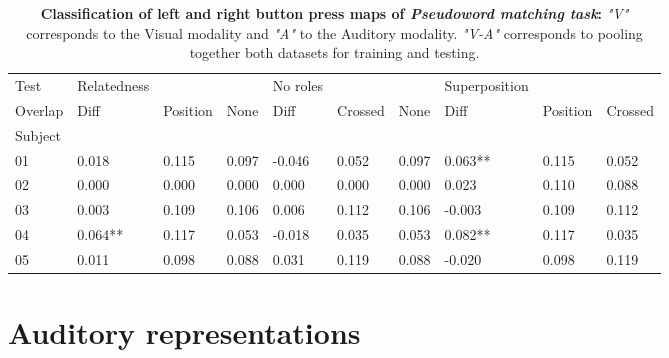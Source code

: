 \begin{table}
\begin{tabular}{llllllllll}
\toprule
Test & Relatedness &          &        & No roles &         &        & Superposition &          &         \\
Overlap &        Diff & Position &   None &     Diff & Crossed &   None &          Diff & Position & Crossed \\
Subject &             &          &        &          &         &        &               &          &         \\
\midrule
01      &       0.018 &    0.115 &  0.097 &   -0.046 &   0.052 &  0.097 &       0.063** &    0.115 &   0.052 \\
02      &       0.000 &    0.000 &  0.000 &    0.000 &   0.000 &  0.000 &         0.023 &    0.110 &   0.088 \\
03      &       0.003 &    0.109 &  0.106 &    0.006 &   0.112 &  0.106 &        -0.003 &    0.109 &   0.112 \\
04      &     0.064** &    0.117 &  0.053 &   -0.018 &   0.035 &  0.053 &       0.082** &    0.117 &   0.035 \\
05      &       0.011 &    0.098 &  0.088 &    0.031 &   0.119 &  0.088 &        -0.020 &    0.098 &   0.119 \\
\bottomrule
\end{tabular}
\vspace{10ex}
\caption{\textbf{Classification of left and right button press maps of \emph{Pseudoword matching task}:} \emph{"V"} corresponds to the Visual modality and \emph{"A"} to the Auditory modality. \emph{"V-A"} corresponds to pooling together both datasets for training and testing.}
\label{table:superposition tests}
\end{table}

\vspace{40ex}



\section{Auditory representations}






